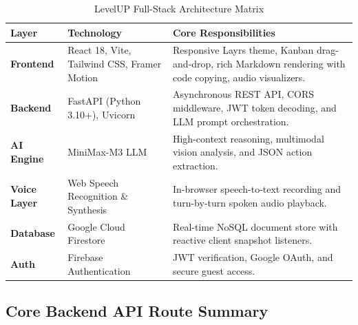 ﻿\documentclass[11pt,a4paper]{article}
\begin{document}
\begin{table}[H]
\centering
\small
\begin{tabularx}{\textwidth}{l p{4.0cm} X}
\toprule
\textbf{Layer} & \textbf{Technology} & \textbf{Core Responsibilities} \\
\midrule
\textbf{Frontend} & React 18, Vite, Tailwind CSS, Framer Motion & Responsive Layrs theme, Kanban drag-and-drop, rich Markdown rendering with code copying, audio visualizers. \\
\addlinespace
\textbf{Backend} & FastAPI (Python 3.10+), Uvicorn & Asynchronous REST API, CORS middleware, JWT token decoding, and LLM prompt orchestration. \\
\addlinespace
\textbf{AI Engine} & MiniMax-M3 LLM & High-context reasoning, multimodal vision analysis, and JSON action extraction. \\
\addlinespace
\textbf{Voice Layer} & Web Speech Recognition \& Synthesis & In-browser speech-to-text recording and turn-by-turn spoken audio playback. \\
\addlinespace
\textbf{Database} & Google Cloud Firestore & Real-time NoSQL document store with reactive client snapshot listeners. \\
\addlinespace
\textbf{Auth} & Firebase Authentication & JWT verification, Google OAuth, and secure guest access. \\
\bottomrule
\end{tabularx}
\caption{LevelUP Full-Stack Architecture Matrix}
\end{table}

\subsection{Core Backend API Route Summary}
\end{document}
